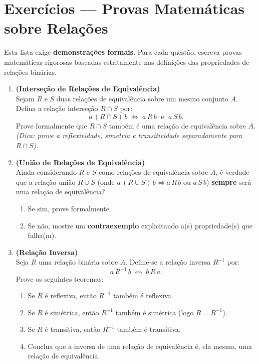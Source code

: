 \documentclass[12pt]{article}
\begin{document}
\vspace*{0.2cm}
\section*{Exercícios — Provas Matemáticas sobre Relações}

Esta lista exige \textbf{demonstrações formais}. Para cada questão, escreva provas matemáticas rigorosas baseadas estritamente nas definições das propriedades de relações binárias.

\vspace{0.4cm}
\begin{enumerate}

\item \textbf{(Interseção de Relações de Equivalência)}\\
Sejam $R$ e $S$ duas relações de equivalência sobre um mesmo conjunto $A$. Defina a relação interseção $R \cap S$ por:
\[
a\,(R \cap S)\,b \;\Longleftrightarrow\; a\,R\,b \;\text{ e }\; a\,S\,b.
\]
Prove formalmente que $R \cap S$ também é uma relação de equivalência sobre $A$. 
\textit{(Dica: prove a reflexividade, simetria e transitividade separadamente para $R \cap S$).}

\vspace{0.3cm}
\item \textbf{(União de Relações de Equivalência)}\\
Ainda considerando $R$ e $S$ como relações de equivalência sobre $A$, é verdade que a relação união $R \cup S$ (onde $a\,(R \cup S)\,b \Leftrightarrow a\,R\,b$ ou $a\,S\,b$) \textbf{sempre} será uma relação de equivalência? 
\begin{enumerate}[label=\alph*)]
    \item Se sim, prove formalmente.
    \item Se não, mostre um \textbf{contraexemplo} explicitando a(s) propriedade(s) que falha(m).
\end{enumerate}

\vspace{0.3cm}
\item \textbf{(Relação Inversa)}\\
Seja $R$ uma relação binária sobre $A$. Define-se a relação inversa $R^{-1}$ por:
\[
a\,R^{-1}\,b \;\Longleftrightarrow\; b\,R\,a.
\]
Prove os seguintes teoremas:
\begin{enumerate}[label=\alph*)]
    \item Se $R$ é reflexiva, então $R^{-1}$ também é reflexiva.
    \item Se $R$ é simétrica, então $R^{-1}$ também é simétrica (logo $R = R^{-1}$).
    \item Se $R$ é transitiva, então $R^{-1}$ também é transitiva.
    \item Conclua que a inversa de uma relação de equivalência é, ela mesma, uma relação de equivalência.
\end{enumerate}


\end{enumerate}
\end{document}
